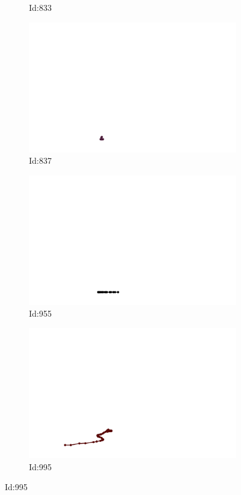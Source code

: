 \documentclass[12pt,twoside]{report}
\begin{document}
\begin{figure}
\begin{subfigure}[b]{0.20\textwidth}
\caption{Id:833}
\end{subfigure}
\begin{subfigure}[b]{0.20\textwidth}
\centering
\includegraphics[width=\textwidth]{../../trajectories/837.png}
\caption{Id:837}
\end{subfigure}
\begin{subfigure}[b]{0.20\textwidth}
\centering
\includegraphics[width=\textwidth]{../../trajectories/955.png}
\caption{Id:955}
\end{subfigure}
\begin{subfigure}[b]{0.20\textwidth}
\centering
\includegraphics[width=\textwidth]{../../trajectories/995.png}
\caption{Id:995}
\end{subfigure}
\end{figure}
\end{document}
